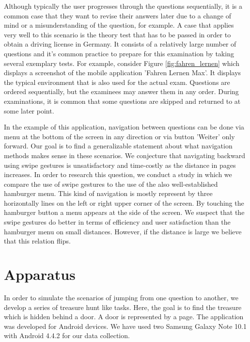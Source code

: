 \documentclass{sig-alternate-05-2015}
\begin{document}
Although typically the user progresses through the questions sequentially, it is a
common case that they want to revise their answers later due to a change of
mind or a misunderstanding of the question, for example. A case that applies very
well to this scenario is the theory test that has to be passed in order to obtain
a driving license in Germany. It consists of a relatively large number of questions and it's common practice to prepare for this examination by taking several exemplary tests. For example, consider Figure \ref{fig:fahren_lernen} which displays a screenshot of the
mobile application 'Fahren Lernen Max'. It displays the typical environment that
is also used for the actual exam. Questions are ordered sequentially, but the examinees
may answer them in any order. During examinations, it is common that some questions are
skipped and returned to at some later point.

In the example of this application, navigation between questions can be done via menu at the bottom of the screen in any direction or via button 'Weiter' only forward. Our goal is to find a generalizable statement about what navigation methods makes sense in these scenarios. We conjecture that navigating backward using swipe gestures is unsatisfactory and time-costly as the distance in pages increases. In order to research this question, we conduct a study in which we compare the use of swipe gestures to the use of the also well-established hamburger menu. This kind of navigation is mostly represent by three horizontally lines on the left or right upper corner of the screen. By touching the hamburger button a menu appears at the side of the screen. We suspect that the swipe gestures do better in terms of efficiency and user satisfaction than the hamburger menu on small distances. However, if the distance is large we believe that this relation flips.


\section{Apparatus}
In order to simulate the scenarios of jumping from one question to another, we develop a series of treasure hunt like tasks. Here, the goal is to find the treasure which is hidden behind a door. A door is represented by a page. The application was developed for Android devices. We have used two Samsung Galaxy Note 10.1 with Android 4.4.2 for our data collection.
\end{document}
